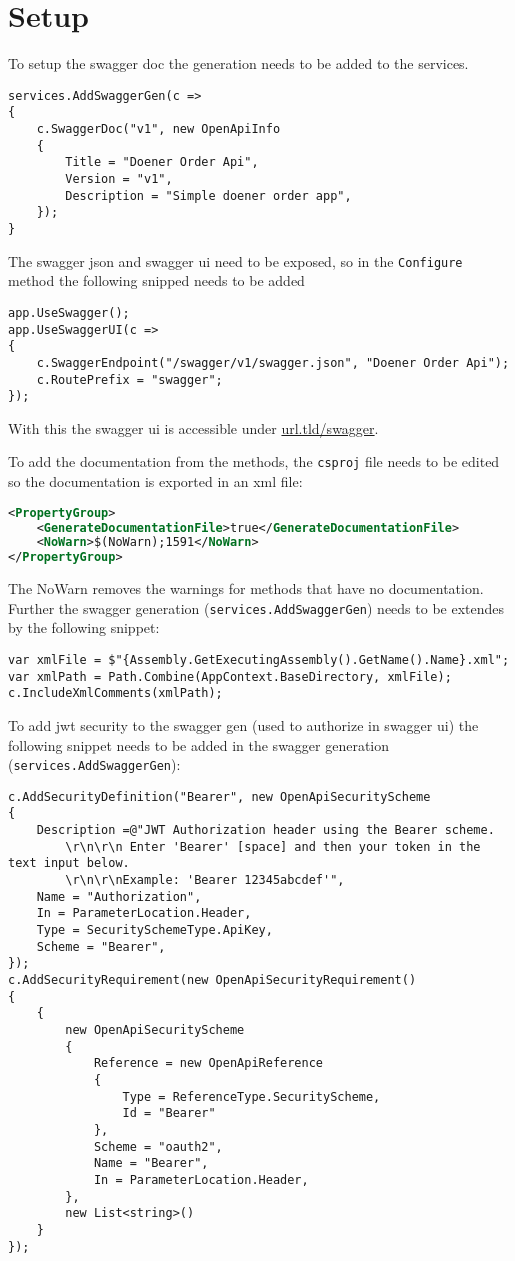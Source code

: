 \documentclass[12pt, a4paper, parskip=half]{scrreprt}
\begin{document}
\section{Setup}
To setup the swagger doc the generation needs to be added to the services. 
\begin{lstlisting}
services.AddSwaggerGen(c =>
{
	c.SwaggerDoc("v1", new OpenApiInfo
	{
		Title = "Doener Order Api",
		Version = "v1",
		Description = "Simple doener order app",
	});
}
\end{lstlisting}
The swagger json and swagger ui need to be exposed, so in the \lstinline|Configure| method the following snipped needs to be added 
\begin{lstlisting}
app.UseSwagger();
app.UseSwaggerUI(c =>
{
	c.SwaggerEndpoint("/swagger/v1/swagger.json", "Doener Order Api");
	c.RoutePrefix = "swagger";
});
\end{lstlisting}
With this the swagger ui is accessible under \href{url.tld/swagger}{url.tld/swagger}.

To add the documentation from the methods, the \lstinline|csproj| file needs to be edited so the documentation is exported in an xml file:
\begin{lstlisting}[language=XML]
<PropertyGroup>
	<GenerateDocumentationFile>true</GenerateDocumentationFile>
	<NoWarn>$(NoWarn);1591</NoWarn>
</PropertyGroup>
\end{lstlisting}
The NoWarn removes the warnings for methods that have no documentation. Further the swagger generation (\lstinline|services.AddSwaggerGen|) needs to be extendes by the following snippet:
\begin{lstlisting}
var xmlFile = $"{Assembly.GetExecutingAssembly().GetName().Name}.xml";
var xmlPath = Path.Combine(AppContext.BaseDirectory, xmlFile);
c.IncludeXmlComments(xmlPath);
\end{lstlisting}

To add jwt security to the swagger gen (used to authorize in swagger ui) the following snippet needs to be added in the swagger generation (\lstinline|services.AddSwaggerGen|):
\begin{lstlisting}
c.AddSecurityDefinition("Bearer", new OpenApiSecurityScheme
{
	Description =@"JWT Authorization header using the Bearer scheme. 
		\r\n\r\n Enter 'Bearer' [space] and then your token in the text input below. 
		\r\n\r\nExample: 'Bearer 12345abcdef'",
	Name = "Authorization",
	In = ParameterLocation.Header,
	Type = SecuritySchemeType.ApiKey,
	Scheme = "Bearer",
});
c.AddSecurityRequirement(new OpenApiSecurityRequirement()
{
	{
		new OpenApiSecurityScheme
		{
			Reference = new OpenApiReference
			{
				Type = ReferenceType.SecurityScheme,
				Id = "Bearer"
			},
			Scheme = "oauth2",
			Name = "Bearer",
			In = ParameterLocation.Header,
		},
		new List<string>()
	}
});
\end{lstlisting}
\end{document}
